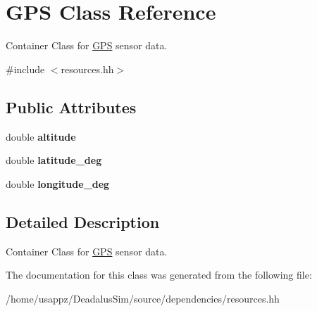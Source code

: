 \hypertarget{classGPS}{\section{\-G\-P\-S \-Class \-Reference}
\label{classGPS}
}


\-Container \-Class for \hyperlink{classGPS}{\-G\-P\-S} sensor data.  




{\ttfamily \#include $<$resources.\-hh$>$}

\subsection*{\-Public \-Attributes}
\begin{DoxyCompactItemize}
\item 
\hypertarget{classGPS_a6cad8c8b40c8d08bf3d0e9092d5e937f}{double {\bfseries altitude}}\label{classGPS_a6cad8c8b40c8d08bf3d0e9092d5e937f}

\item 
\hypertarget{classGPS_aa17b87d756ef70409bde2cb38fa0d036}{double {\bfseries latitude\-\_\-deg}}\label{classGPS_aa17b87d756ef70409bde2cb38fa0d036}

\item 
\hypertarget{classGPS_a6bafc9ae5dac5949afea29c19e5eb20b}{double {\bfseries longitude\-\_\-deg}}\label{classGPS_a6bafc9ae5dac5949afea29c19e5eb20b}

\end{DoxyCompactItemize}


\subsection{\-Detailed \-Description}
\-Container \-Class for \hyperlink{classGPS}{\-G\-P\-S} sensor data. 

\-The documentation for this class was generated from the following file\-:\begin{DoxyCompactItemize}
\item 
/home/usappz/\-Deadalus\-Sim/source/dependencies/resources.\-hh\end{DoxyCompactItemize}
